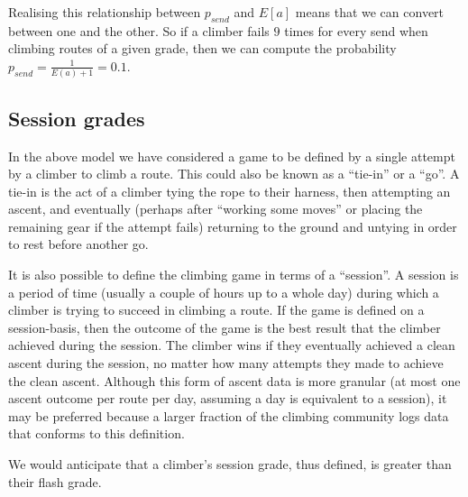 \documentclass{article}
\begin{document}
Realising this relationship between $p_{send}$ and $ E\left[a\right]$ means that we can convert between one and the other. So if a climber fails $9$ times for every send when climbing routes of a given grade, then we can compute the probability  $p_{send} = \frac{1}{E(a)+1} = 0.1$.

\subsection*{Session grades}

In the above model we have considered a game to be defined by a single attempt by a climber to climb a route. This could also be known as a ``tie-in'' or a ``go''. A tie-in is the act of a climber tying the rope to their harness, then attempting an ascent, and eventually (perhaps after ``working some moves'' or placing the remaining gear if the attempt fails) returning to the ground and untying in order to rest before another go.

It is also possible to define the climbing game in terms of a ``session''. A session is a period of time (usually a couple of hours up to a whole day) during which a climber is trying to succeed in climbing a route. If the game is defined on a session-basis, then the outcome of the game is the best result that the climber achieved during the session. The climber wins if they eventually achieved a clean ascent during the session, no matter how many attempts they made to achieve the clean ascent. Although this form of ascent data is more granular (at most one ascent outcome per route per day, assuming a day is equivalent to a session), it may be preferred because a larger fraction of the climbing community logs data that conforms to this definition.

We would anticipate that a climber's session grade, thus defined, is greater than their flash grade. 
\end{document}
